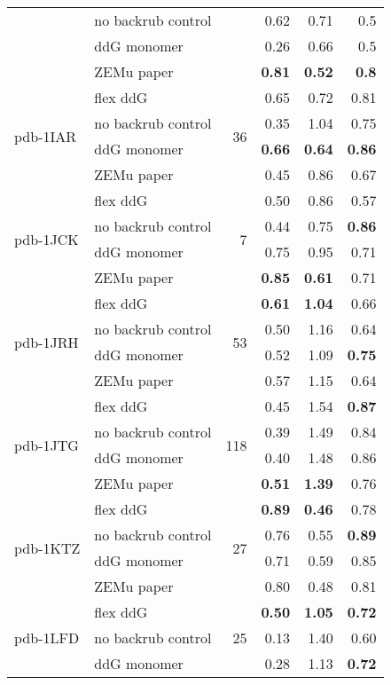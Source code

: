 \begin{table}
\begin{tabular}{llrrrr}
 & no backrub control & & 0.62 & 0.71 & 0.5  \\
 & ddG monomer & & 0.26 & 0.66 & 0.5  \\
 & ZEMu paper & & \textbf{0.81} & \textbf{0.52} & \textbf{0.8}  \\
\hline
 \multirow{ 4}{*}{pdb-1IAR} & flex ddG & \multirow{ 4}{*}{36} & 0.65 & 0.72 & 0.81  \\
 & no backrub control & & 0.35 & 1.04 & 0.75  \\
 & ddG monomer & & \textbf{0.66} & \textbf{0.64} & \textbf{0.86}  \\
 & ZEMu paper & & 0.45 & 0.86 & 0.67  \\
\hline
 \multirow{ 4}{*}{pdb-1JCK} & flex ddG & \multirow{ 4}{*}{7} & 0.50 & 0.86 & 0.57  \\
 & no backrub control & & 0.44 & 0.75 & \textbf{0.86}  \\
 & ddG monomer & & 0.75 & 0.95 & 0.71  \\
 & ZEMu paper & & \textbf{0.85} & \textbf{0.61} & 0.71  \\
\hline
 \multirow{ 4}{*}{pdb-1JRH} & flex ddG & \multirow{ 4}{*}{53} & \textbf{0.61} & \textbf{1.04} & 0.66  \\
 & no backrub control & & 0.50 & 1.16 & 0.64  \\
 & ddG monomer & & 0.52 & 1.09 & \textbf{0.75}  \\
 & ZEMu paper & & 0.57 & 1.15 & 0.64  \\
\hline
 \multirow{ 4}{*}{pdb-1JTG} & flex ddG & \multirow{ 4}{*}{118} & 0.45 & 1.54 & \textbf{0.87}  \\
 & no backrub control & & 0.39 & 1.49 & 0.84  \\
 & ddG monomer & & 0.40 & 1.48 & 0.86  \\
 & ZEMu paper & & \textbf{0.51} & \textbf{1.39} & 0.76  \\
\hline
 \multirow{ 4}{*}{pdb-1KTZ} & flex ddG & \multirow{ 4}{*}{27} & \textbf{0.89} & \textbf{0.46} & 0.78  \\
 & no backrub control & & 0.76 & 0.55 & \textbf{0.89}  \\
 & ddG monomer & & 0.71 & 0.59 & 0.85  \\
 & ZEMu paper & & 0.80 & 0.48 & 0.81  \\
\hline
 \multirow{ 4}{*}{pdb-1LFD} & flex ddG & \multirow{ 4}{*}{25} & \textbf{0.50} & \textbf{1.05} & \textbf{0.72}  \\
 & no backrub control & & 0.13 & 1.40 & 0.60  \\
 & ddG monomer & & 0.28 & 1.13 & \textbf{0.72}  \\

\end{tabular}
\end{table}
